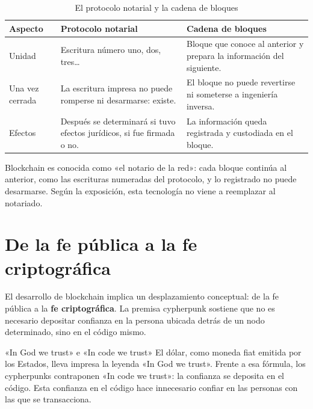 \documentclass[12pt,oneside]{book}
\begin{document}
\begin{table}[H]
\centering
\caption{El protocolo notarial y la cadena de bloques}
\begin{tabular}{p{}p{}p{}}
\toprule
\textbf{Aspecto} & \textbf{Protocolo notarial} & \textbf{Cadena de bloques} \\
\midrule
Unidad & Escritura número uno, dos, tres… & Bloque que conoce al anterior y prepara la información del siguiente. \\
Una vez cerrada & La escritura impresa no puede romperse ni desarmarse: existe. & El bloque no puede revertirse ni someterse a ingeniería inversa. \\
Efectos & Después se determinará si tuvo efectos jurídicos, si fue firmada o no. & La información queda registrada y custodiada en el bloque. \\
\bottomrule
\end{tabular}
\end{table}

\begin{important}
Blockchain es conocida como «el notario de la red»: cada bloque continúa al anterior, como las escrituras numeradas del protocolo, y lo registrado no puede desarmarse. Según la exposición, esta tecnología no viene a reemplazar al notariado.
\end{important}

\section{De la fe pública a la fe criptográfica}

El desarrollo de blockchain implica un desplazamiento conceptual: de la fe pública a la \textbf{fe criptográfica}. La premisa cypherpunk sostiene que no es necesario depositar confianza en la persona ubicada detrás de un nodo determinado, sino en el código mismo.

\begin{example}{«In God we trust» e «In code we trust»}
El dólar, como moneda fiat emitida por los Estados, lleva impresa la leyenda «In God we trust». Frente a esa fórmula, los cypherpunks contraponen «In code we trust»: la confianza se deposita en el código. Esta confianza en el código hace innecesario confiar en las personas con las que se transacciona.
\end{example}
\end{document}
